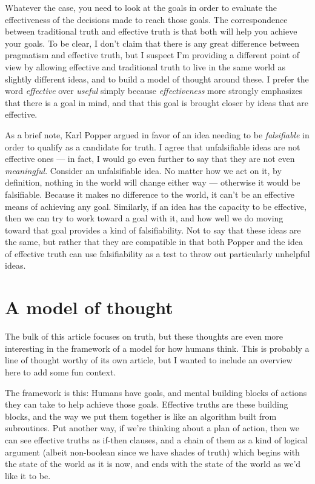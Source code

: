 \documentclass[20pt,]{extarticle}
\begin{document}
Whatever the case, you need to look at the goals in order to evaluate
the effectiveness of the decisions made to reach those goals. The
correspondence between traditional truth and effective truth is that
both will help you achieve your goals. To be clear, I don't claim that
there is any great difference between pragmatism and effective truth,
but I suspect I'm providing a different point of view by allowing
effective and traditional truth to live in the same world as slightly
different ideas, and to build a model of thought around these. I prefer
the word \emph{effective} over \emph{useful} simply because
\emph{effectiveness} more strongly emphasizes that there is a goal in
mind, and that this goal is brought closer by ideas that are effective.

As a brief note, Karl Popper argued in favor of an idea needing to be
\emph{falsifiable} in order to qualify as a candidate for truth. I agree
that unfalsifiable ideas are not effective ones --- in fact, I would go
even further to say that they are not even \emph{meaningful}. Consider
an unfalsifiable idea. No matter how we act on it, by definition,
nothing in the world will change either way --- otherwise it would be
falsifiable. Because it makes no difference to the world, it can't be an
effective means of achieving any goal. Similarly, if an idea has the
capacity to be effective, then we can try to work toward a goal with it,
and how well we do moving toward that goal provides a kind of
falsifiability. Not to say that these ideas are the same, but rather
that they are compatible in that both Popper and the idea of effective
truth can use falsifiability as a test to throw out particularly
unhelpful ideas.

\section{A model of thought}\label{a-model-of-thought}

The bulk of this article focuses on truth, but these thoughts are even
more interesting in the framework of a model for how humans think. This
is probably a line of thought worthy of its own article, but I wanted to
include an overview here to add some fun context.

The framework is this: Humans have goals, and mental building blocks of
actions they can take to help achieve those goals. Effective truths are
these building blocks, and the way we put them together is like an
algorithm built from subroutines. Put another way, if we're thinking
about a plan of action, then we can see effective truths as if-then
clauses, and a chain of them as a kind of logical argument (albeit
non-boolean since we have shades of truth) which begins with the state
of the world as it is now, and ends with the state of the world as we'd
like it to be.
\end{document}
